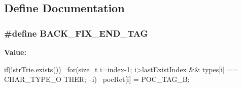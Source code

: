 \subsection{Define Documentation}
\subsubsection[{BACK\_\-FIX\_\-END\_\-TAG}]{\setlength{\rightskip}{0pt plus 5cm}\#define BACK\_\-FIX\_\-END\_\-TAG}\label{CMAPOCTagger_8cc_ade4a8a577cf7ba922fe9fd16af219b2f}
{\bfseries Value:}
\begin{DoxyCode}
if(!strTrie.exists()){ \
                for(size_t i=index-1; i>lastExistIndex && types[i] == CHAR_TYPE_O
      THER; --i) \
                        pocRet[i] = POC_TAG_B;}
\end{DoxyCode}
